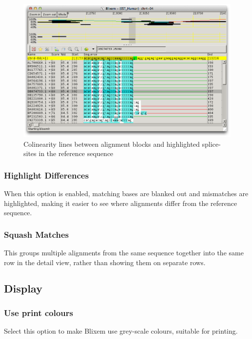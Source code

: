 \documentclass[letterpaper]{article}
\begin{document}
\begin{figure}
\centering
\color[rgb]{0.30980393,0.5058824,0.7411765}
\includegraphics[width=\textwidth]{img_view_colinearity.png}
\caption{Colinearity lines between alignment blocks and highlighted splice-sites in the reference sequence}
\end{figure}

\bigskip

{\color[rgb]{0.30980393,0.5058824,0.7411765}\subsubsection[Highlight Differences]{Highlight Differences}}
\hypertarget{RefHeading2361056909880}{}
When this option is enabled, matching bases are blanked out and mismatches are highlighted, making it easier to see where alignments differ from the reference sequence.

\bigskip

{\color[rgb]{0.30980393,0.5058824,0.7411765}\subsubsection[Squash Matches ]{Squash Matches }}
\hypertarget{RefHeading2381056909880}{}
This groups multiple alignments from the same sequence together into the same row in the detail view, rather than showing them on separate rows.

\bigskip

{\color[rgb]{0.30980393,0.5058824,0.7411765}\subsection[Display]{Display}}
\hypertarget{RefHeading2421056909880}{}
{\color[rgb]{0.30980393,0.5058824,0.7411765}\subsubsection[Use print colours]{Use print colours}}
\hypertarget{RefHeading2641056909880}{}
Select this option to make Blixem use grey-scale colours, suitable for printing.
\end{document}
